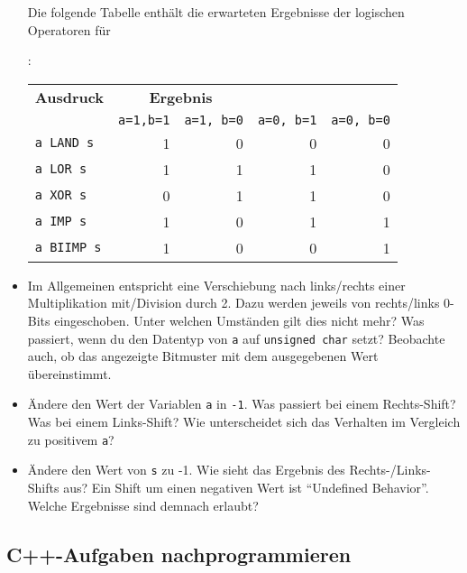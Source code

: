 \begin{itemize}
Die folgende Tabelle enthält die erwarteten Ergebnisse der logischen Operatoren für 
 :\\
\begin{tabular}{lrrrr}
    \toprule
    \textbf{Ausdruck} & \multicolumn{2}{c}{\textbf{Ergebnis}}\\
    & \lstinline|a=1,b=1| & \lstinline|a=1, b=0| & \lstinline|a=0, b=1| & \lstinline|a=0, b=0|\\
    \midrule
    \texttt{a LAND s}  & 1  & 0& 0& 0\\
    \texttt{a LOR s}   & 1  & 1& 1& 0\\
    \texttt{a XOR s}   & 0  & 1& 1& 0\\
    \texttt{a IMP s}   & 1  & 0& 1& 1\\
    \texttt{a BIIMP s} & 1  & 0& 0& 1\\
    \bottomrule
\end{tabular}
\item 
Im Allgemeinen entspricht eine Verschiebung nach links/rechts einer Multiplikation mit/Division durch 2.
Dazu werden jeweils von rechts/links 0-Bits eingeschoben.
Unter welchen Umständen gilt dies nicht mehr?
Was passiert, wenn du den Datentyp von \lstinline|a| auf \lstinline|unsigned char| setzt?
Beobachte auch, ob das angezeigte Bitmuster mit dem ausgegebenen Wert übereinstimmt.
\item 
Ändere den Wert der Variablen \lstinline|a| in \lstinline|-1|.
Was passiert bei einem Rechts-Shift?
Was bei einem Links-Shift?
Wie unterscheidet sich das Verhalten im Vergleich zu positivem \lstinline|a|?
\item 
Ändere den Wert von \lstinline|s| zu -1.
Wie sieht das Ergebnis des Rechts-/Links-Shifts aus?
Ein Shift um einen negativen Wert ist \enquote{Undefined Behavior}.
Welche Ergebnisse sind demnach erlaubt?
\end{itemize}

\subsection{C++-Aufgaben nachprogrammieren \optional}

